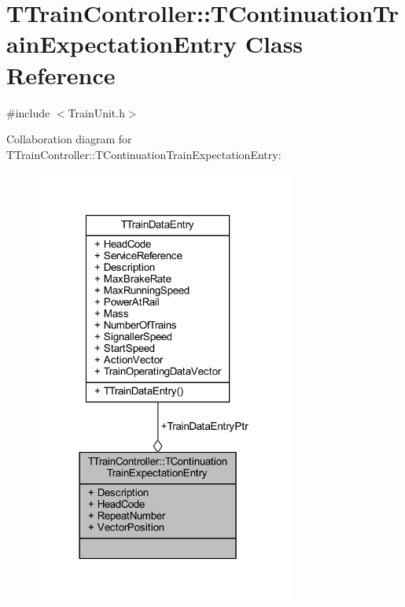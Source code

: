 \hypertarget{class_t_train_controller_1_1_t_continuation_train_expectation_entry}{}\section{T\+Train\+Controller\+:\+:T\+Continuation\+Train\+Expectation\+Entry Class Reference}
\label{class_t_train_controller_1_1_t_continuation_train_expectation_entry}


{\ttfamily \#include $<$Train\+Unit.\+h$>$}



Collaboration diagram for T\+Train\+Controller\+:\+:T\+Continuation\+Train\+Expectation\+Entry\+:
\nopagebreak
\begin{figure}[H]
\begin{center}
\leavevmode
\includegraphics[width=242pt]{class_t_train_controller_1_1_t_continuation_train_expectation_entry__coll__graph}
\end{center}
\end{figure}

